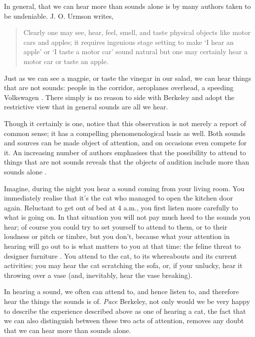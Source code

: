 \documentclass[sloppy, journal, git, bytitle, dodraft]{humapap}
\begin{document}
In general, that we can hear more than sounds alone is by many authors taken to be undeniable. J. O. Urmson writes, 
\begin{quote}
Clearly one may see, hear, feel, smell, and taste physical objects like motor cars and apples; it requires ingenious stage setting to make `I hear an apple' or `I taste a motor car' sound natural \lips but one may certainly hear a motor car or taste an apple.\autocite[p. 117]{urmson1968aa}
\end{quote} Just as we can see a magpie, or taste the vinegar in our salad, we can hear things that are not sounds: people in the corridor, aeroplanes overhead, a speeding Volkswagen \autocite[cf.][p. 10-11]{heidegger1977aa}. There simply is no reason to side with Berkeley and adopt the restrictive view that in general sounds are all we hear. 

Though it certainly is one, notice that this observation is not merely a report of common sense; it has a compelling phenomenological basis as well. Both sounds and sources can be made object of attention, and on occasions even compete for it. An increasing number of authors emphasises that the possibility to attend to things that are not sounds reveals that the objects of audition include more than sounds alone \autocite[See the papers in][]{ocallaghan2009aa}.  

Imagine, during the night you hear a sound coming from your living room. You immediately realise that it's the cat who managed to open the kitchen door again. Reluctant to get out of bed at 4 a.m., you first listen more carefully to what is going on. In that situation you will not pay much heed to the sounds you hear; of course you could try to set yourself to attend to them, or to their loudness or pitch or timbre, but you don't, because what your attention in hearing will go out to is what matters to you at that time: the feline threat to designer furniture \autocite[cf.][]{nudds2007aa}. You attend to the cat, to its whereabouts and its current activities; you may hear the cat scratching the sofa, or, if your unlucky, hear it throwing over a vase (and, inevitably, hear the vase breaking).

In hearing a sound, we often can attend to, and hence listen to, and therefore hear the things the sounds is of. \emph{Pace} Berkeley, not only would we be very happy to describe the experience described above as one of hearing a cat, the fact that we can also distinguish between these two acts of attention, removes any doubt that we can hear more than sounds alone.
\end{document}
